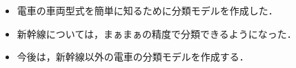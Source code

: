 \newpage


\label{MUSUBI}
\begin{itemize}
	\item 電車の車両型式を簡単に知るために分類モデルを作成した．
	\item 新幹線については，まぁまぁの精度で分類できるようになった．
	\item 今後は，新幹線以外の電車の分類モデルを作成する．
\end{itemize}
\newpage






%
%





